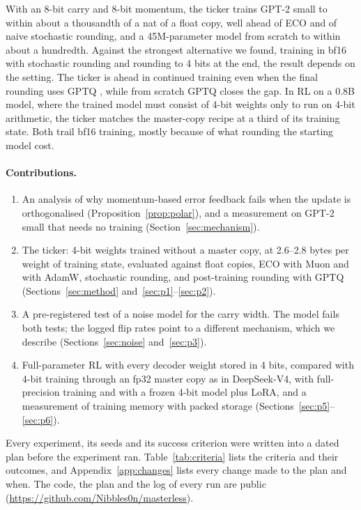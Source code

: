 \documentclass[11pt]{article}
\begin{document}
With an 8-bit carry and 8-bit momentum, the ticker trains GPT-2 small to within about a thousandth of a nat of a
float copy, well ahead of ECO and of naive stochastic rounding, and a 45M-parameter model from scratch to within about
a hundredth. Against the strongest
alternative we found, training in bf16 with stochastic rounding and rounding to 4 bits at the end, the result depends
on the setting. The ticker is ahead in continued training even when the final rounding uses GPTQ
\citep{frantar2023gptq}, while from scratch GPTQ closes the gap. In RL on a 0.8B model, where the trained model must
consist of 4-bit weights only to run on 4-bit arithmetic, the ticker matches the master-copy recipe at a third of its
training state. Both trail bf16 training, mostly because of what rounding the starting model cost.

\paragraph{Contributions.}
\begin{enumerate}
  \item An analysis of why momentum-based error feedback fails when the update is orthogonalised
        (Proposition~\ref{prop:polar}), and a measurement on GPT-2 small that needs no training
        (Section~\ref{sec:mechanism}).
  \item The ticker: 4-bit weights trained without a master copy, at 2.6--2.8 bytes per weight of training state,
        evaluated against float copies, ECO with Muon and with AdamW, stochastic rounding, and post-training rounding
        with GPTQ (Sections~\ref{sec:method} and~\ref{sec:p1}--\ref{sec:p2}).
  \item A pre-registered test of a noise model for the carry width. The model fails both tests; the logged flip rates
        point to a different mechanism, which we describe (Sections~\ref{sec:noise} and~\ref{sec:p3}).
  \item Full-parameter RL with every decoder weight stored in 4 bits, compared with 4-bit training through an fp32
        master copy as in DeepSeek-V4, with full-precision training and with a frozen 4-bit model plus LoRA, and a
        measurement of training memory with packed storage
        (Sections~\ref{sec:p5}--\ref{sec:p6}).
\end{enumerate}

Every experiment, its seeds and its success criterion were written into a dated plan before the experiment ran.
Table~\ref{tab:criteria} lists the criteria and their outcomes, and Appendix~\ref{app:changes} lists every change made
to the plan and when. The code, the plan and the log of every run are public
(\url{https://github.com/Nibbles0n/masterless}).
\end{document}
